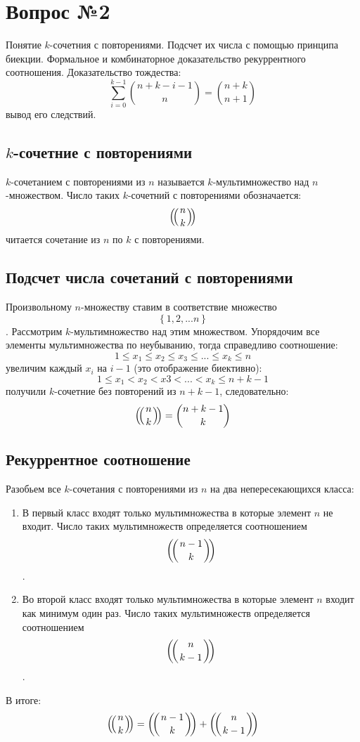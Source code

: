 \chapter{Вопрос №2}

Понятие $k$-сочетния с повторениями. Подсчет их числа с помощью принципа биекции. Формальное и комбинаторное доказательство рекуррентного соотношения. Доказательство тождества:
\[
	\sum_{i=0}^{k-1}\binom{n+k-i-1}{n} = \binom{n+k}{n+1}
\]
вывод его следствий.

\section{$k$-сочетние с повторениями}

$k$-сочетанием с повторениями из $n$ называется $k$-мультимножество над $n$-множеством. Число таких $k$-сочетний с повторениями обозначается:
\[
	\left(\negmedspace\left({{n}\atop{k}}\right)\negmedspace\right)
\]
читается сочетание из $n$ по $k$ с повторениями.

\section{Подсчет числа сочетаний с повторениями}
Произвольному $n$-множеству ставим в соответствие множество $$ \left\{1, 2, ... n\right\}$$. Рассмотрим $k$-мультимножество над этим множеством. Упорядочим все элементы мультимножества по неубыванию, тогда справедливо соотношение:
\[
	1 \le x_1 \le x_2 \le x_3 \le ... \le x_k \le n
\]
увеличим каждый $x_i$ на $i-1$ (это отображение биективно):
\[
	1 \le x_1 < x_2 < x3 < ... <x_k \le n + k - 1
\]
получили $k$-сочетние без повторений из $n+k-1$, следовательно:
\begin{equation}
	\left(\negmedspace\left({{n}\atop{k}}\right)\negmedspace\right) = \binom{n+k-1}{k}
\end{equation}
\section{Рекуррентное соотношение}
Разобьем все $k$-сочетания с повторениями из $n$ на два непересекающихся класса:
\begin{enumerate}
\item В первый класс входят только мультимножества в которые элемент $n$ не входит. Число таких мультимножеств определяется соотношением $$ \left(\negmedspace\left({{n-1}\atop{k}}\right)\negmedspace\right) $$.

\item Во второй класс входят только мультимножества в которые элемент $n$ входит как минимум один раз. Число таких мультимножеств определяется соотношением $$ \left(\negmedspace\left({{n}\atop{k-1}}\right)\negmedspace\right) $$.
\end{enumerate}
В итоге:
\begin{equation}
\left(\negmedspace\left({{n}\atop{k}}\right)\negmedspace\right) = \left(\negmedspace\left({{n-1}\atop{k}}\right)\negmedspace\right) + \left(\negmedspace\left({{n}\atop{k-1}}\right)\negmedspace\right)
\end{equation}

